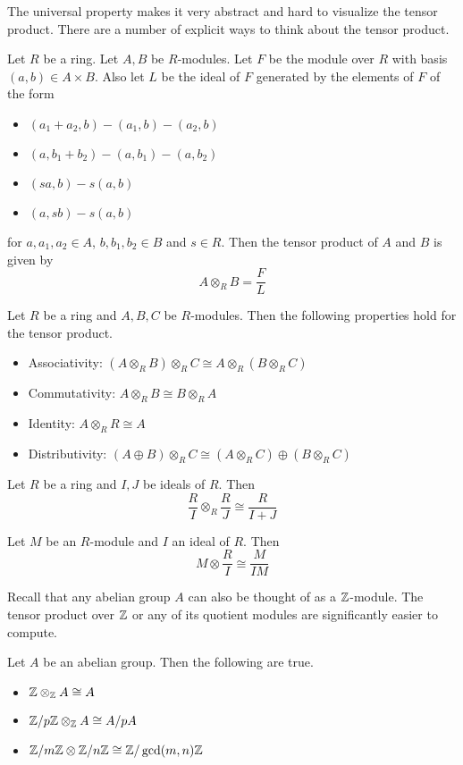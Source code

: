 \documentclass[a4paper]{article}
\begin{document}
The universal property makes it very abstract and hard to visualize the tensor product. There are a number of explicit ways to think about the tensor product. 

\begin{lmm}{}{} Let $R$ be a ring. Let $A,B$ be $R$-modules. Let $F$ be the module over $R$ with basis $(a,b)\in A\times B$. Also let $L$ be the ideal of $F$ generated by the elements of $F$ of the form 
\begin{itemize}
\item $(a_1+a_2,b)-(a_1,b)-(a_2,b)$
\item $(a,b_1+b_2)-(a,b_1)-(a,b_2)$
\item $(sa,b)-s(a,b)$
\item $(a,sb)-s(a,b)$
\end{itemize}
for $a,a_1,a_2\in A$, $b,b_1,b_2\in B$ and $s\in R$. Then the tensor product of $A$ and $B$ is given by $$A\otimes_RB=\frac{F}{L}$$
\end{lmm}

\begin{prp}{}{} Let $R$ be a ring and $A,B,C$ be $R$-modules. Then the following properties hold for the tensor product. 
\begin{itemize}
\item Associativity: $(A\otimes_RB)\otimes_RC\cong A\otimes_R(B\otimes_RC)$
\item Commutativity: $A\otimes_R B\cong B\otimes_RA$
\item Identity: $A\otimes_RR\cong A$
\item Distributivity: $(A\oplus B)\otimes_R C\cong(A\otimes_RC)\oplus(B\otimes_RC)$
\end{itemize}
\end{prp}

\begin{prp}{}{} Let $R$ be a ring and $I,J$ be ideals of $R$. Then $$\frac{R}{I}\otimes_R\frac{R}{J}\cong\frac{R}{I+J}$$
\end{prp}

\begin{prp}{}{} Let $M$ be an $R$-module and $I$ an ideal of $R$. Then $$M\otimes\frac{R}{I}\cong\frac{M}{IM}$$
\end{prp}

Recall that any abelian group $A$ can also be thought of as a $\mathbb{Z}$-module. The tensor product over $\mathbb{Z}$ or any of its quotient modules are significantly easier to compute. 

\begin{prp}{}{} Let $A$ be an abelian group. Then the following are true. 
\begin{itemize}
\item $\mathbb{Z}\otimes_{\mathbb{Z}} A\cong A$
\item $\mathbb{Z}/p\mathbb{Z}\otimes_{\mathbb{Z}} A\cong A/pA$
\item $\mathbb{Z}/m\mathbb{Z}\otimes \mathbb{Z}/n\mathbb{Z}\cong\mathbb{Z}/\gcd(m,n)\mathbb{Z}$
\end{itemize}
\end{prp}
\end{document}
